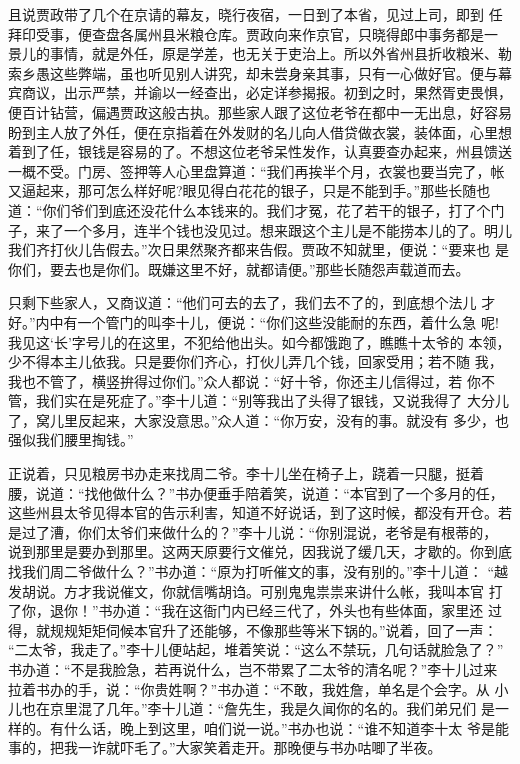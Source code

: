 且说贾政带了几个在京请的幕友，晓行夜宿，一日到了本省，见过上司，即到
任拜印受事，便查盘各属州县米粮仓库。贾政向来作京官，只晓得郎中事务都是一
景儿的事情，就是外任，原是学差，也无关于吏治上。所以外省州县折收粮米、勒
索乡愚这些弊端，虽也听见别人讲究，却未尝身亲其事，只有一心做好官。便与幕
宾商议，出示严禁，并谕以一经查出，必定详参揭报。初到之时，果然胥吏畏惧，
便百计钻营，偏遇贾政这般古执。那些家人跟了这位老爷在都中一无出息，好容易
盼到主人放了外任，便在京指着在外发财的名儿向人借贷做衣裳，装体面，心里想
着到了任，银钱是容易的了。不想这位老爷呆性发作，认真要查办起来，州县馈送
一概不受。门房、签押等人心里盘算道：“我们再挨半个月，衣裳也要当完了，帐
又逼起来，那可怎么样好呢?眼见得白花花的银子，只是不能到手。”那些长随也
道：“你们爷们到底还没花什么本钱来的。我们才冤，花了若干的银子，打了个门
子，来了一个多月，连半个钱也没见过。想来跟这个主儿是不能捞本儿的了。明儿
我们齐打伙儿告假去。”次日果然聚齐都来告假。贾政不知就里，便说：“要来也
是你们，要去也是你们。既嫌这里不好，就都请便。”那些长随怨声载道而去。

只剩下些家人，又商议道：“他们可去的去了，我们去不了的，到底想个法儿
才好。”内中有一个管门的叫李十儿，便说：“你们这些没能耐的东西，着什么急
呢!我见这‘长’字号儿的在这里，不犯给他出头。如今都饿跑了，瞧瞧十太爷的
本领，少不得本主儿依我。只是要你们齐心，打伙儿弄几个钱，回家受用；若不随
我，我也不管了，横竖拚得过你们。”众人都说：“好十爷，你还主儿信得过，若
你不管，我们实在是死症了。”李十儿道：“别等我出了头得了银钱，又说我得了
大分儿了，窝儿里反起来，大家没意思。”众人道：“你万安，没有的事。就没有
多少，也强似我们腰里掏钱。”

正说着，只见粮房书办走来找周二爷。李十儿坐在椅子上，跷着一只腿，挺着
腰，说道：“找他做什么？”书办便垂手陪着笑，说道：“本官到了一个多月的任，
这些州县太爷见得本官的告示利害，知道不好说话，到了这时候，都没有开仓。若
是过了漕，你们太爷们来做什么的？”李十儿说：“你别混说，老爷是有根蒂的，
说到那里是要办到那里。这两天原要行文催兑，因我说了缓几天，才歇的。你到底
找我们周二爷做什么？”书办道：“原为打听催文的事，没有别的。”李十儿道：
“越发胡说。方才我说催文，你就信嘴胡诌。可别鬼鬼祟祟来讲什么帐，我叫本官
打了你，退你！”书办道：“我在这衙门内已经三代了，外头也有些体面，家里还
过得，就规规矩矩伺候本官升了还能够，不像那些等米下锅的。”说着，回了一声：
“二太爷，我走了。”李十儿便站起，堆着笑说：“这么不禁玩，几句话就脸急了？”
书办道：“不是我脸急，若再说什么，岂不带累了二太爷的清名呢？”李十儿过来
拉着书办的手，说：“你贵姓啊？”书办道：“不敢，我姓詹，单名是个会字。从
小儿也在京里混了几年。”李十儿道：“詹先生，我是久闻你的名的。我们弟兄们
是一样的。有什么话，晚上到这里，咱们说一说。”书办也说：“谁不知道李十太
爷是能事的，把我一诈就吓毛了。”大家笑着走开。那晚便与书办咕唧了半夜。

